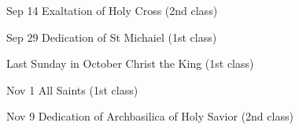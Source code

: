 {{
\bigskip
\benedicamusdomino{}
}

Sep 14 Exaltation of Holy Cross (2nd class)

Sep 29 Dedication of St Michaiel (1st class)

Last Sunday in October Christ the King (1st class)

Nov 1 All Saints (1st class)

Nov 9 Dedication of Archbasilica of Holy Savior (2nd class)





}
